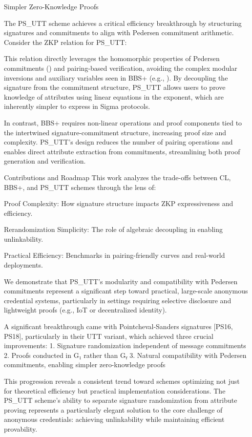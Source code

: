 {Simpler Zero-Knowledge Proofs

The PS_UTT scheme achieves a critical efficiency breakthrough by structuring signatures and commitments to align with Pedersen commitment arithmetic. Consider the ZKP relation for PS_UTT:


This relation directly leverages the homomorphic properties of Pedersen commitments () and pairing-based verification, avoiding the complex modular inversions and auxiliary variables seen in BBS+ (e.g., ). By decoupling the signature from the commitment structure, PS_UTT allows users to prove knowledge of attributes using linear equations in the exponent, which are inherently simpler to express in Sigma protocols.

In contrast, BBS+ requires non-linear operations  and proof components tied to the intertwined signature-commitment structure, increasing proof size and complexity. PS_UTT’s design reduces the number of pairing operations and enables direct attribute extraction from commitments, streamlining both proof generation and verification.

Contributions and Roadmap
This work analyzes the trade-offs between CL, BBS+, and PS_UTT schemes through the lens of:

Proof Complexity: How signature structure impacts ZKP expressiveness and efficiency.

Rerandomization Simplicity: The role of algebraic decoupling in enabling unlinkability.

Practical Efficiency: Benchmarks in pairing-friendly curves and real-world deployments.

We demonstrate that PS_UTT’s modularity and compatibility with Pedersen commitments represent a significant step toward practical, large-scale anonymous credential systems, particularly in settings requiring selective disclosure and lightweight proofs (e.g., IoT or decentralized identity).




A significant breakthrough came with Pointcheval-Sanders signatures [PS16, PS18], particularly in their UTT variant, which achieved three crucial improvements:
1. Signature randomization independent of message commitments
2. Proofs conducted in G₁ rather than Gᵧ
3. Natural compatibility with Pedersen commitments, enabling simpler zero-knowledge proofs

This progression reveals a consistent trend toward schemes optimizing not just for theoretical efficiency but practical implementation considerations. The PS_UTT scheme's ability to separate signature randomization from attribute proving represents a particularly elegant solution to the core challenge of anonymous credentials: achieving unlinkability while maintaining efficient provability.


}
